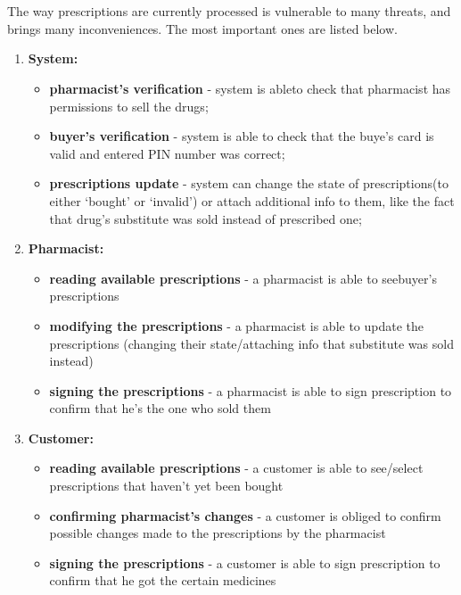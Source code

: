 \chapter{   }
\section{ }


The way prescriptions are currently processed is vulnerable to many threats, and brings many inconveniences. The most important ones are listed below.

\begin{enumerate}
\item{\textbf{System:}}
\begin{itemize}
\item{\textbf{pharmacist's verification} - system is ableto check that pharmacist has permissions to sell the drugs;}
\item{\textbf{buyer's verification} - system is able to check that the buye's card is valid and entered PIN number was correct;}
\item{\textbf{prescriptions update} - system can change the state of prescriptions(to either \textquoteleft{}bought\textquoteright{} or \textquoteleft{}invalid\textquoteright{}) or attach additional info to them, like the fact that drug\textquoteright{}s substitute was sold instead of prescribed one;}
\end{itemize}
\item{\textbf{Pharmacist:}}
\begin{itemize}
\item {\textbf{reading available prescriptions} - a pharmacist is able to seebuyer\textquoteright{}s prescriptions}
\item{\textbf{modifying the prescriptions} - a pharmacist is able to update the prescriptions (changing their state/attaching info that substitute was sold instead)}
\item{\textbf{signing the prescriptions} - a pharmacist is able to sign prescription to confirm that he\textquoteright{}s the one who sold them}
\end{itemize}
\item{\textbf{Customer:}}
\begin{itemize}
\item {\textbf{reading available prescriptions} - a customer is able to see/select prescriptions that haven\textquoteright{}t yet been bought}
\item{\textbf{confirming pharmacist\textquoteright{}s changes} - a customer is obliged to confirm possible changes made to the prescriptions by the pharmacist}
\item{\textbf{signing the prescriptions} - a customer is able to sign prescription
to confirm that he got the certain medicines}
\end{itemize}
\end{enumerate}



